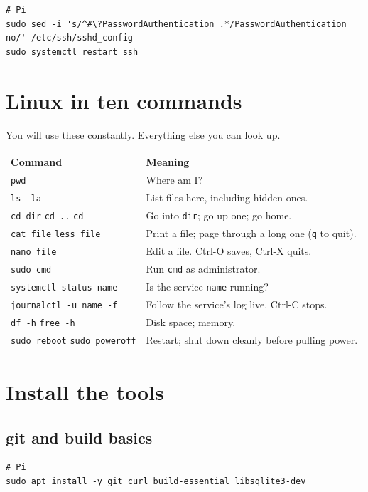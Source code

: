 \documentclass[11pt,letterpaper]{article}
\newcommand{\cmd}[1]{\texttt{#1}}
\begin{document}
\begin{lstlisting}
# Pi
sudo sed -i 's/^#\?PasswordAuthentication .*/PasswordAuthentication no/' /etc/ssh/sshd_config
sudo systemctl restart ssh
\end{lstlisting}

\section{Linux in ten commands}

You will use these constantly. Everything else you can look up.

\begin{tabular}{@{}lp{9cm}@{}}
\toprule
Command & Meaning \\
\midrule
\cmd{pwd} & Where am I? \\
\cmd{ls -la} & List files here, including hidden ones. \\
\cmd{cd dir} \quad \cmd{cd ..} \quad \cmd{cd} & Go into \cmd{dir}; go up one; go home. \\
\cmd{cat file} \quad \cmd{less file} & Print a file; page through a long one (\cmd{q} to quit). \\
\cmd{nano file} & Edit a file. Ctrl-O saves, Ctrl-X quits. \\
\cmd{sudo cmd} & Run \cmd{cmd} as administrator. \\
\cmd{systemctl status name} & Is the service \cmd{name} running? \\
\cmd{journalctl -u name -f} & Follow the service's log live. Ctrl-C stops. \\
\cmd{df -h} \quad \cmd{free -h} & Disk space; memory. \\
\cmd{sudo reboot} \quad \cmd{sudo poweroff} & Restart; shut down cleanly before pulling power. \\
\bottomrule
\end{tabular}

\section{Install the tools}

\subsection{git and build basics}

\begin{lstlisting}
# Pi
sudo apt install -y git curl build-essential libsqlite3-dev
\end{lstlisting}
\end{document}
